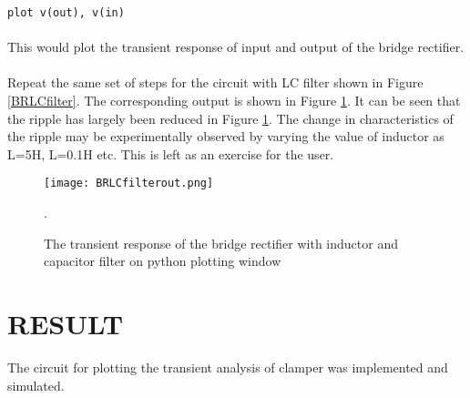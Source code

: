 \texttt{plot v(out), v(in) }

\paragraph{}

This would plot the transient response of input and output of the bridge rectifier. 

\paragraph{}Repeat the same set of steps for the circuit with LC filter shown in Figure \ref{BRLCfilter}. The corresponding output is shown in Figure \ref{BRLCfilterout}.  It can be seen that the ripple has largely been reduced in Figure \ref{BRLCfilterout}. The change in characteristics of the ripple may be experimentally observed by varying the value of inductor as L=5H, L=0.1H etc. This is left as an exercise for the user.

\begin{figure}[h]
\centering
\texttt{[image: BRLCfilterout.png]}
\caption{The transient response of the bridge rectifier with inductor and capacitor filter on python plotting window}
\label{BRLCfilterout}.
\end{figure}

\section*{RESULT}
The circuit for plotting the transient analysis of clamper was implemented and simulated.


